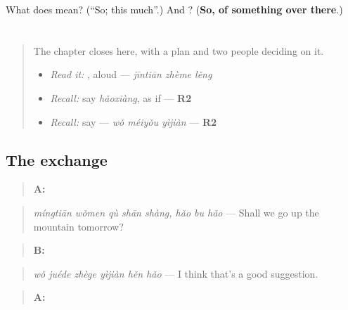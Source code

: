 \begin{tcolorbox}[breakable,colback=teal!4,colframe=teal!35!black,title={Before you move on}]
What does  mean? (\textquotedblleft{}So; this much\textquotedblright{}.) And ? (\textbf{So, of something over there}.)
\end{tcolorbox}
\section[Practice]{}

\label{lesson:ZH-C280-practice}



\begin{quote}
The chapter closes here, with a plan and two people deciding on it.

\begin{itemize}
\raggedright
  \item \emph{Read it:} , aloud — \emph{jīntiān zhème lěng}
  \item \emph{Recall:} say \emph{hǎoxiàng}, as if — \textbf{R2}
  \item \emph{Recall:} say  — \emph{wǒ méiyǒu yìjiàn} — \textbf{R2}
\end{itemize}
\end{quote}

\subsection*{The exchange}
\begin{quote}
\textbf{A:}  
\end{quote}

\begin{quote}
\emph{míngtiān wǒmen qù shān shàng, hǎo bu hǎo} — Shall we go up the mountain tomorrow?
\end{quote}

\begin{quote}
\textbf{B:} 
\end{quote}

\begin{quote}
\emph{wǒ juéde zhège yìjiàn hěn hǎo} — I think that's a good suggestion.
\end{quote}

\begin{quote}
\textbf{A:} 
\end{quote}

